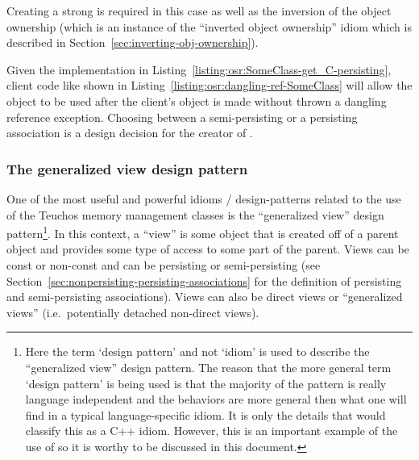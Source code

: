 \documentclass[pdf,ps2pdf,11pt]{SANDreport}
\begin{document}
Creating a strong {} is required in this case as well as the
inversion of the object ownership (which is an instance of the
``inverted object ownership'' idiom which is described in
Section~\ref{sec:inverting-obj-ownership}).

Given the implementation in
Listing~\ref{listing:osr:SomeClass-get_C-persisting}, client code like
shown in Listing~\ref{listing:osr:dangling-ref-SomeClass} will allow
the {} object to be used after the client's
{} object is made {} without thrown a
dangling reference exception.  Choosing between a semi-persisting or a
persisting association is a design decision for the creator of
{}.


%
{}\subsubsection{The generalized view design pattern}
\label{sec:generalized-view-design-pattern}
%

One of the most useful and powerful idioms / design-patterns related
to the use of the Teuchos memory management classes is the
``generalized view'' design pattern\footnote{Here the term `design
pattern' and not `idiom' is used to describe the ``generalized view''
design pattern.  The reason that the more general term `design
pattern' is being used is that the majority of the pattern is really
language independent and the behaviors are more general then what one
will find in a typical language-specific idiom.  It is only the
{} details that would classify this as a C++ idiom.  However,
this is an important example of the use of {} so it is worthy
to be discussed in this document.}.  In this context, a ``view'' is
some object that is created off of a parent object and provides some
type of access to some part of the parent.  Views can be const or
non-const and can be persisting or semi-persisting (see
Section~\ref{sec:nonpersisting-persisting-associations} for the
definition of persisting and semi-persisting associations).  Views can
also be direct views or ``generalized views'' (i.e.\ potentially
detached non-direct views).
\end{document}
